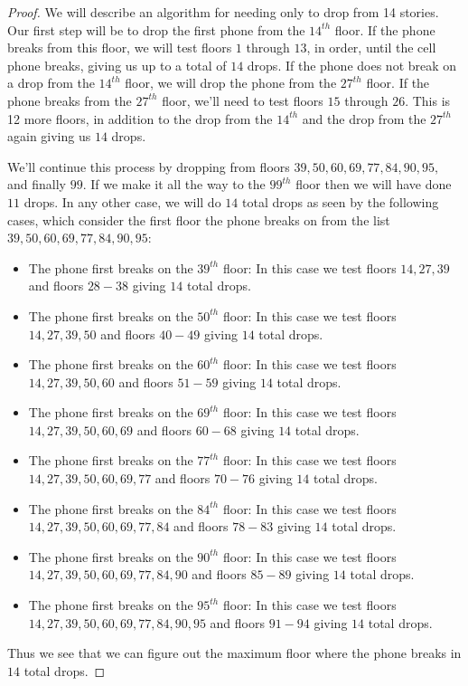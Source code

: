 \documentclass{article}  %
\begin{document}
\begin{proof}
We will describe an algorithm for needing only to drop from 14 stories. Our first step will be to drop the first phone from the $14^{th}$ floor. If the phone breaks from this floor, we will test floors $1$ through $13$, in order, until the cell phone breaks, giving us up to a total of $14$ drops. If the phone does not break on a drop from the $14^{th}$ floor, we will drop the phone from the $27^{th}$ floor. If the phone breaks from the $27^{th}$ floor, we'll need to test floors $15$ through $26$. This is 12 more floors, in addition to the drop from the $14^{th}$ and the drop from the $27^{th}$ again giving us $14$ drops. 

We'll continue this process by dropping from floors $39, 50, 60, 69, 77, 84, 90, 95,$ and finally $99$. If we make it all the way to the $99^{th}$ floor then we will have done $11$ drops. In any other case, we will do $14$ total drops as seen by the following cases, which consider the first floor the phone breaks on from the list $39, 50, 60, 69, 77, 84, 90, 95$:
	\begin{itemize}
	\item The phone first breaks on the $39^{th}$ floor: In this case we test floors $14, 27, 39$ and floors $28-38$ giving $14$ total drops.
	\item The phone first breaks on the $50^{th}$ floor: In this case we test floors $14, 27, 39, 50$ and floors $40-49$ giving $14$ total drops.
	\item The phone first breaks on the $60^{th}$ floor: In this case we test floors $14, 27, 39, 50, 60$ and floors $51-59$ giving $14$ total drops.
	\item The phone first breaks on the $69^{th}$ floor: In this case we test floors $14, 27, 39, 50, 60, 69$ and floors $60-68$ giving $14$ total drops.
	\item The phone first breaks on the $77^{th}$ floor: In this case we test floors $14, 27, 39, 50, 60, 69, 77$ and floors $70-76$ giving $14$ total drops.
	\item The phone first breaks on the $84^{th}$ floor: In this case we test floors $14, 27, 39, 50, 60, 69, 77, 84$ and floors $78-83$ giving $14$ total drops.
	\item The phone first breaks on the $90^{th}$ floor: In this case we test floors $14, 27, 39, 50, 60, 69, 77, 84,90$ and floors $85-89$ giving $14$ total drops.
	\item The phone first breaks on the $95^{th}$ floor: In this case we test floors $14, 27, 39, 50, 60, 69, 77, 84,90,95$ and floors $91-94$ giving $14$ total drops.
	\end{itemize}

Thus we see that we can figure out the maximum floor where the phone breaks in $14$ total drops.
\end{proof}
\end{document}
